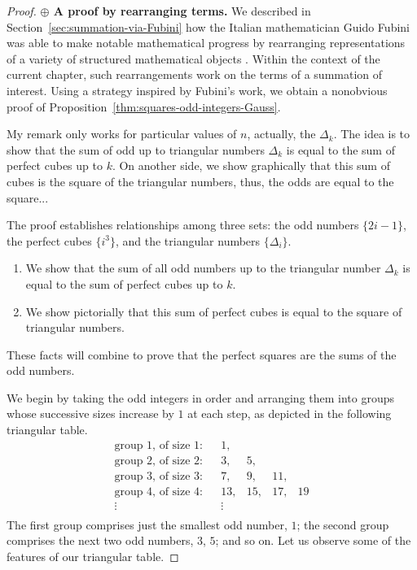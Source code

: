 \begin{proof}
{\bf $\oplus$ A proof by rearranging terms.}
%
We described in Section~\ref{sec:summation-via-Fubini} how the Italian mathematician
Guido Fubini 
was able to make notable mathematical progress by rearranging
representations of a variety of structured mathematical objects \cite{Fubini}.  Within the context of the current
chapter, such rearrangements work on the terms of a summation of
interest.  Using a strategy inspired by Fubini's work, we obtain a nonobvious proof of
Proposition~\ref{thm:squares-odd-integers-Gauss}.

{\Denis My remark only works for particular values of $n$, actually, the $\Delta_k$.
The idea is to show that the sum of odd up to triangular numbers $\Delta_k$ is equal to the sum of perfect cubes up to $k$.
On another side, we show graphically  that this sum of cubes is the square of the triangular numbers, thus, the odds are equal to the square...}

\medskip

The proof establishes relationships among three sets: the odd numbers $\{2i-1\}$, the perfect cubes $\{i^3\}$, 
and the triangular numbers $\{ \Delta_i \}$.
\begin{enumerate}
\item
We show that the sum of all odd numbers up to the triangular number $\Delta_k$ is equal
to the sum of perfect cubes up to $k$.
\item
We show pictorially that this sum of perfect cubes is equal to the square of triangular numbers.
\end{enumerate}
These facts will combine to prove that the perfect squares are the sums of the odd numbers.

\medskip

We begin by taking the odd integers in order and arranging them into groups whose successive sizes
increase by $1$ at each step, as depicted in the following triangular table.
\[
\begin{array}{llrrrrclcc}
\mbox{group $1$, of size 1:} & &
1,  &    &     &      \\
\mbox{group $2$, of size 2:} & &
3,  &  5, &     &      \\
\mbox{group $3$, of size 3:} & &
7,  &  9, & 11, &     \\
\mbox{group $4$, of size 4:} & &
13, & 15, & 17, & 19   \\
\vdots & & \vdots \\
\end{array}
\]
The first group comprises just the smallest odd number, $1$;
the second group comprises the next two odd numbers, $3$, $5$; and so on.
Let us observe some of the features of our triangular table.


\end{proof}
